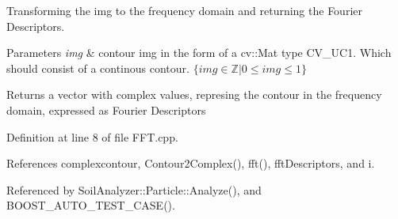 Transforming the img to the frequency domain and returning the Fourier Descriptors. 


\begin{DoxyParams}{Parameters}
{\em img} & contour img in the form of a cv\+::\+Mat type C\+V\+\_\+U\+C1. Which should consist of a continous contour. $ \{ img \in \mathbb{Z} | 0 \leq img \leq 1 \} $ \\
\hline
\end{DoxyParams}
\begin{DoxyReturn}{Returns}
a vector with complex values, represing the contour in the frequency domain, expressed as Fourier Descriptors 
\end{DoxyReturn}


Definition at line 8 of file F\+F\+T.\+cpp.



References complexcontour, Contour2\+Complex(), fft(), fft\+Descriptors, and i.



Referenced by Soil\+Analyzer\+::\+Particle\+::\+Analyze(), and B\+O\+O\+S\+T\+\_\+\+A\+U\+T\+O\+\_\+\+T\+E\+S\+T\+\_\+\+C\+A\+S\+E().


